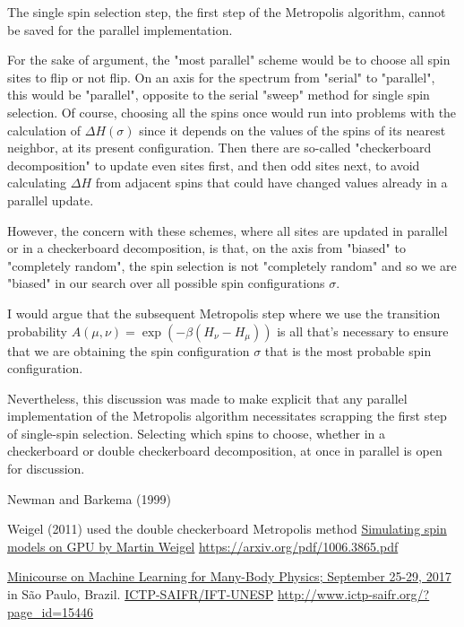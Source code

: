 \documentclass[10pt]{amsart}
\begin{document}
\begin{multicols*}{2}
The single spin selection step, the first step of the Metropolis algorithm, cannot be saved for the parallel implementation.  

For the sake of argument, the "most parallel" scheme would be to choose all spin sites to flip or not flip.  On an axis for the spectrum from "serial" to "parallel", this would be "parallel", opposite to the serial "sweep" method for single spin selection.  Of course, choosing all the spins once would run into problems with the calculation of $\Delta H(\sigma)$ since it depends on the values of the spins of its nearest neighbor, at its present configuration.  Then there are so-called "checkerboard decomposition" to update even sites first, and then odd sites next, to avoid calculating $\Delta H$ from adjacent spins that could have changed values already in a parallel update.  

However, the concern with these schemes, where all sites are updated in parallel or in a checkerboard decomposition, is that, on the axis from "biased" to "completely random", the spin selection is not "completely random" and so we are "biased" in our search over all possible spin configurations $\sigma$.  

I would argue that the subsequent Metropolis step where we use the transition probability $A(\mu,\nu) = \exp{(-\beta(H_{\nu} - H_{\mu}))}$ is all that's necessary to ensure that we are obtaining the spin configuration $\sigma$ that is the most probable spin configuration.  

Nevertheless, this discussion was made to make explicit that any parallel implementation of the Metropolis algorithm necessitates scrapping the first step of single-spin selection.  Selecting which spins to choose, whether in a checkerboard or double checkerboard decomposition, at once in parallel is open for discussion.      

 





Newman and Barkema (1999) \cite{NeBa1999}



Weigel (2011) used the double checkerboard Metropolis method  
\href{https://arxiv.org/pdf/1006.3865.pdf}{Simulating spin models on GPU by Martin Weigel} \url{https://arxiv.org/pdf/1006.3865.pdf}



\href{http://www.ictp-saifr.org/?page_id=15446}{Minicourse on Machine Learning for Many-Body Physics; September 25-29, 2017} in S\~{a}o Paulo, Brazil.  \href{http://www.ictp-saifr.org/}{ICTP-SAIFR/IFT-UNESP}    \url{http://www.ictp-saifr.org/?page_id=15446}







\end{multicols*}
\end{document}
